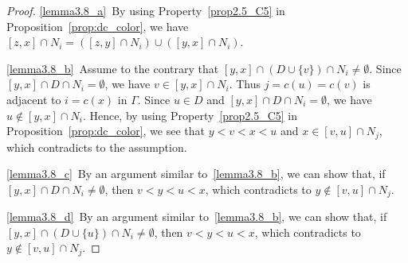 \documentclass[ALCO,ThmDefs,Unicode,epreuves]{cedram}
\begin{document}
\begin{proof}
\ref{lemma3.8_a}~By using Property~\ref{prop2.5_C5} in Proposition~\ref{prop:dc_color}, 
we have $[z,x] \cap N_i = ( [z,y] \cap N_i ) \cup ( [y,x] \cap N_i)$.

\ref{lemma3.8_b}~Assume to the contrary that $[y,x] \cap (D \cup \{ v \}) \cap N_i \neq \emptyset$.
Since $[y,x] \cap D \cap N_i = \emptyset$, we have $v \in [y,x] \cap N_i$.
Thus $j = c(u) = c(v)$ is adjacent to $i = c(x)$ in $\Gamma$.
Since $u \in D$ and $[y,x] \cap D \cap N_i = \emptyset$, we have $u \not\in [y,x] \cap N_i$.
Hence, by using Property~\ref{prop2.5_C5} in Proposition~\ref{prop:dc_color},
we see that $y < v < x < u$ and $x \in [v,u] \cap N_j$, 
which contradicts to the assumption.

\ref{lemma3.8_c}~By an argument similar to~\ref{lemma3.8_b}, we can show that, if $[y,x] \cap D \cap N_i \neq \emptyset$, 
then $v < y < u < x$, which contradicts to $y \not\in [v,u] \cap N_j$.

\ref{lemma3.8_d}~By an argument similar to~\ref{lemma3.8_b}, we can show that, if $[y,x] \cap (D \cup \{ u \}) \cap N_i \neq \emptyset$, 
then $v < y < u < x$, which contradicts to $y \not\in [v,u] \cap N_j$.
\end{proof}
\end{document}
